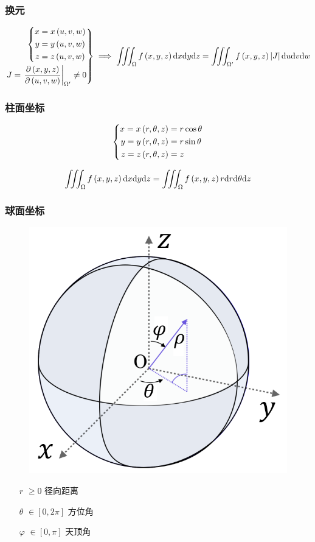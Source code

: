 \documentclass{article}
\begin{document}
\subsubsection{换元}

\[\left.\begin{aligned}
        \left\{\begin{aligned}
                   x & =x\left(u,v,w\right) \\
                   y & =y\left(u,v,w\right) \\
                   z & =z\left(u,v,w\right)
               \end{aligned}\right. \\
        J=\left.\frac{\partial\left(x,y,z\right)}{\partial\left(u,v,w\right)}\right|_{\Omega^\prime}\neq0
    \end{aligned}\right\}\implies
    \iiint_\Omega f\left(x,y,z\right)\mathrm d x\mathrm d y\mathrm d z=
    \iiint_{\Omega^\prime}f\left(x,y,z\right)\left|J\right|\mathrm d u\mathrm d v\mathrm d w\]

\subsubsection{柱面坐标}

\[\left\{\begin{aligned}
        x=x\left(r,\theta,z\right) & =r\cos\theta \\
        y=y\left(r,\theta,z\right) & =r\sin\theta \\
        z=z\left(r,\theta,z\right) & =z
    \end{aligned}\right.\]

\[\iiint_\Omega f\left(x,y,z\right)\mathrm d x\mathrm d y\mathrm d z=
    \iiint_\Omega f\left(x,y,z\right)r\mathrm d r\mathrm d\theta\mathrm d z\]

\subsubsection{球面坐标}

\begin{figure}[H]
    \centering
    \includegraphics[width=0.2\linewidth]{SphericalCoordinates.png}
\end{figure}

\begin{enumerate}
    \item[$r$] $\geqslant0$ 径向距离
    \item[$\theta$] $\in\left[0,2\pi\right]$ 方位角
    \item[$\varphi$] $\in\left[0,\pi\right]$ 天顶角
\end{enumerate}
\end{document}
